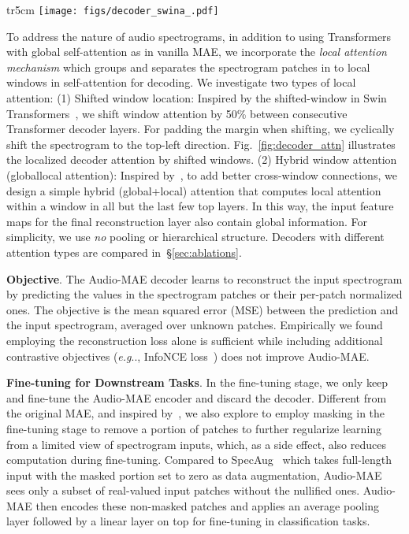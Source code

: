 \documentclass{article}
\makeatletter
\DeclareRobustCommand\onedot{\futurelet\@let@token\@onedot}
\def\@onedot{\ifx\@let@token.\else.\null\fi\xspace}
\def\eg{\emph{e.g}\onedot} \def\Eg{\emph{E.g}\onedot}
\makeatother
\begin{document}
\begin{wrapfigure}{tr}{5cm}
    \vspace{-0.5em}
    \centering
    \texttt{[image: figs/decoder\_swina\_.pdf]}
    \caption{Decoder's local attention and shifted window (right). 
    }\label{fig:decoder_attn}
    \vspace{-0.5em}
\end{wrapfigure}

To address the nature of audio spectrograms, in addition to using Transformers with global self-attention as in vanilla MAE, we incorporate the \emph{local attention mechanism} which groups and separates the spectrogram patches in to local windows in self-attention for decoding.
We investigate two types of local attention:
(1) Shifted window location: Inspired by the shifted-window in Swin Transformers~\cite{swin}, we  shift window attention by 50\% between consecutive Transformer decoder layers. 
For padding the margin when shifting, we cyclically shift the spectrogram to the top-left direction. 
Fig.~\ref{fig:decoder_attn} illustrates the localized decoder attention by shifted windows.
(2) Hybrid window attention (globallocal attention): Inspired by~\cite{li2021improved}, to add better cross-window connections, we design a simple hybrid (global+local) attention that computes local attention within a window in all but the last few top layers. In this way, the input feature maps for the final reconstruction layer also contain global information.
For simplicity, we use \textit{no} pooling or hierarchical structure. Decoders with different attention types are compared in~\S\ref{sec:ablations}.


\noindent \textbf{Objective}. 
The Audio-MAE decoder learns to reconstruct the input spectrogram by predicting the values in the spectrogram patches or their per-patch normalized ones. 
The objective is the mean squared error (MSE) between the prediction and the input spectrogram, averaged over unknown patches.
Empirically we found employing the reconstruction loss alone is sufficient while including additional contrastive objectives (\eg, InfoNCE loss~\cite{info_nce}) does not improve Audio-MAE.


\noindent \textbf{Fine-tuning for Downstream Tasks}. 
In the fine-tuning stage, we only keep and fine-tune the Audio-MAE encoder and discard the decoder.
Different from the original MAE, and inspired by~\cite{effective_ssl_speech,paast}, we also explore to employ masking in the fine-tuning stage to remove a portion of patches to further regularize learning from a limited view of spectrogram inputs, which, as a side effect, also reduces computation during fine-tuning. 
Compared to SpecAug~\cite{Park2019SpecAugmentAS} which takes full-length input with the masked portion set to zero as data augmentation, Audio-MAE sees only a subset of real-valued input patches without the nullified ones.
Audio-MAE then encodes these non-masked patches and applies an average pooling layer followed by a linear layer on top for fine-tuning in  classification tasks.
\end{document}
